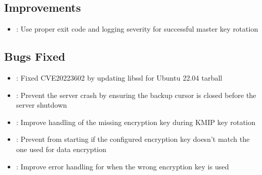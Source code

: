 \documentclass[letterpaper,10pt,english]{sphinxmanual}
\begin{document}
\subsection{Improvements}
\label{\detokenize{release_notes/4.4.17-17:improvements}}\begin{itemize}
\item {} 
\sphinxAtStartPar
{}: Use proper exit code and logging severity for successful master key rotation

\end{itemize}


\subsection{Bugs Fixed}
\label{\detokenize{release_notes/4.4.17-17:bugs-fixed}}\begin{itemize}
\item {} 
\sphinxAtStartPar
{}: Fixed CVE\sphinxhyphen{}2022\sphinxhyphen{}3602 by updating libssl for Ubuntu 22.04 tarball

\item {} 
\sphinxAtStartPar
{}: Prevent the server crash by ensuring the backup cursor is closed before the server shutdown

\item {} 
\sphinxAtStartPar
{}: Improve handling of the missing encryption key during KMIP key rotation

\item {} 
\sphinxAtStartPar
{}: Prevent  from starting if the configured encryption key doesn’t match the one used for data encryption

\item {} 
\sphinxAtStartPar
{}: Improve error handling for  when the wrong encryption key is used

\end{itemize}
\end{document}

